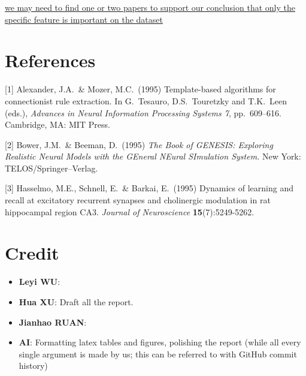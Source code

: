 \documentclass{article}
\begin{document}
\underline{we may need to find one or two papers to support our conclusion that only the specific feature is important on the dataset}

\section*{References}
{
\small


[1] Alexander, J.A.\ \& Mozer, M.C.\ (1995) Template-based algorithms for
connectionist rule extraction. In G.\ Tesauro, D.S.\ Touretzky and T.K.\ Leen
(eds.), {\it Advances in Neural Information Processing Systems 7},
pp.\ 609--616. Cambridge, MA: MIT Press.


[2] Bower, J.M.\ \& Beeman, D.\ (1995) {\it The Book of GENESIS: Exploring
  Realistic Neural Models with the GEneral NEural SImulation System.}  New York:
TELOS/Springer--Verlag.


[3] Hasselmo, M.E., Schnell, E.\ \& Barkai, E.\ (1995) Dynamics of learning and
recall at excitatory recurrent synapses and cholinergic modulation in rat
hippocampal region CA3. {\it Journal of Neuroscience} {\bf 15}(7):5249-5262.
}

\section*{Credit}
\begin{itemize}
    \item \textbf{Leyi WU}: 
    \item \textbf{Hua XU}: Draft all the report.
    \item \textbf{Jianhao RUAN}:
    \item \textbf{AI}: Formatting latex tables and figures, polishing the report (while all every single argument is made by us; this can be referred to with GitHub commit history)

\end{itemize}
\end{document}
